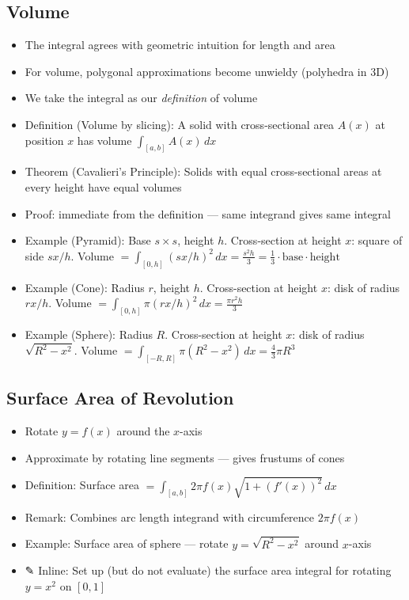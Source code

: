 \documentclass[
  10pt,
  letterpaper,
]{scrbook}
\providecommand{\tightlist}{%
  \setlength{\itemsep}{0pt}\setlength{\parskip}{0pt}}
\begin{document}
\subsection{Volume}\label{volume}

\begin{itemize}
\tightlist
\item
  The integral agrees with geometric intuition for length and area
\item
  For volume, polygonal approximations become unwieldy (polyhedra in 3D)
\item
  We take the integral as our \emph{definition} of volume
\item
  Definition (Volume by slicing): A solid with cross-sectional area
  \(A(x)\) at position \(x\) has volume \(\int_{[a,b]} A(x) \, dx\)
\item
  Theorem (Cavalieri's Principle): Solids with equal cross-sectional
  areas at every height have equal volumes
\item
  Proof: immediate from the definition --- same integrand gives same
  integral
\item
  Example (Pyramid): Base \(s \times s\), height \(h\). Cross-section at
  height \(x\): square of side \(sx/h\). Volume
  \(= \int_{[0,h]} (sx/h)^2 \, dx = \frac{s^2 h}{3} = \frac{1}{3} \cdot \text{base} \cdot \text{height}\)
\item
  Example (Cone): Radius \(r\), height \(h\). Cross-section at height
  \(x\): disk of radius \(rx/h\). Volume
  \(= \int_{[0,h]} \pi(rx/h)^2 \, dx = \frac{\pi r^2 h}{3}\)
\item
  Example (Sphere): Radius \(R\). Cross-section at height \(x\): disk of
  radius \(\sqrt{R^2 - x^2}\). Volume
  \(= \int_{[-R,R]} \pi(R^2 - x^2) \, dx = \frac{4}{3}\pi R^3\)
\end{itemize}

\subsection{Surface Area of
Revolution}\label{surface-area-of-revolution}

\begin{itemize}
\tightlist
\item
  Rotate \(y = f(x)\) around the \(x\)-axis
\item
  Approximate by rotating line segments --- gives frustums of cones
\item
  Definition: Surface area
  \(= \int_{[a,b]} 2\pi f(x) \sqrt{1 + (f'(x))^2} \, dx\)
\item
  Remark: Combines arc length integrand with circumference \(2\pi f(x)\)
\item
  Example: Surface area of sphere --- rotate \(y = \sqrt{R^2 - x^2}\)
  around \(x\)-axis
\item
  ✎ Inline: Set up (but do not evaluate) the surface area integral for
  rotating \(y = x^2\) on \([0, 1]\)
\end{itemize}
\end{document}

